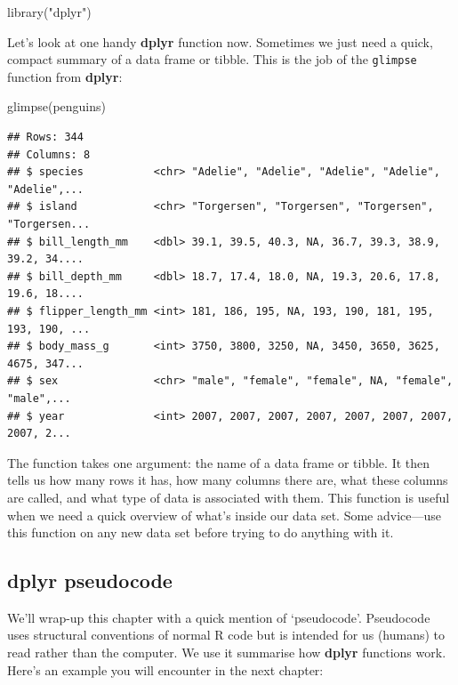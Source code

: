 \documentclass[
]{book}
\newenvironment{Shaded}{\begin{snugshade}}{\end{snugshade}}
\newcommand{\FunctionTok}[1]{\textcolor[rgb]{0.00,0.00,0.00}{#1}}
\newcommand{\NormalTok}[1]{#1}
\newcommand{\StringTok}[1]{\textcolor[rgb]{0.31,0.60,0.02}{#1}}
\begin{document}
\begin{Shaded}
\begin{Highlighting}[]
\FunctionTok{library}\NormalTok{(}\StringTok{"dplyr"}\NormalTok{)}
\end{Highlighting}
\end{Shaded}

Let's look at one handy \textbf{dplyr} function now. Sometimes we just need a quick, compact summary of a data frame or tibble. This is the job of the \texttt{glimpse} function from \textbf{dplyr}:

\begin{Shaded}
\begin{Highlighting}[]
\FunctionTok{glimpse}\NormalTok{(penguins)}
\end{Highlighting}
\end{Shaded}

\begin{verbatim}
## Rows: 344
## Columns: 8
## $ species           <chr> "Adelie", "Adelie", "Adelie", "Adelie", "Adelie",...
## $ island            <chr> "Torgersen", "Torgersen", "Torgersen", "Torgersen...
## $ bill_length_mm    <dbl> 39.1, 39.5, 40.3, NA, 36.7, 39.3, 38.9, 39.2, 34....
## $ bill_depth_mm     <dbl> 18.7, 17.4, 18.0, NA, 19.3, 20.6, 17.8, 19.6, 18....
## $ flipper_length_mm <int> 181, 186, 195, NA, 193, 190, 181, 195, 193, 190, ...
## $ body_mass_g       <int> 3750, 3800, 3250, NA, 3450, 3650, 3625, 4675, 347...
## $ sex               <chr> "male", "female", "female", NA, "female", "male",...
## $ year              <int> 2007, 2007, 2007, 2007, 2007, 2007, 2007, 2007, 2...
\end{verbatim}

The function takes one argument: the name of a data frame or tibble. It then tells us how many rows it has, how many columns there are, what these columns are called, and what type of data is associated with them. This function is useful when we need a quick overview of what's inside our data set. Some advice---use this function on any new data set before trying to do anything with it.

\hypertarget{dplyr-pseudocode}{%
\subsection{\texorpdfstring{\textbf{dplyr} pseudocode}{dplyr pseudocode}}\label{dplyr-pseudocode}}

We'll wrap-up this chapter with a quick mention of `pseudocode'. Pseudocode uses structural conventions of normal R code but is intended for us (humans) to read rather than the computer. We use it summarise how \textbf{dplyr} functions work. Here's an example you will encounter in the next chapter:
\end{document}
